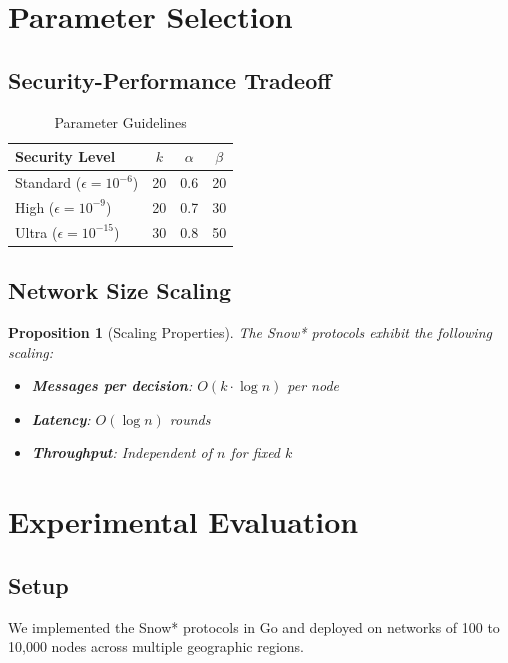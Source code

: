 \documentclass[11pt,a4paper]{article}
\newtheorem{proposition}[theorem]{Proposition}
\begin{document}
\section{Parameter Selection}

\subsection{Security-Performance Tradeoff}

\begin{table}[h]
\centering
\caption{Parameter Guidelines}
\begin{tabular}{@{}lccc@{}}
\toprule
Security Level & $k$ & $\alpha$ & $\beta$ \\
\midrule
Standard ($\epsilon = 10^{-6}$) & 20 & 0.6 & 20 \\
High ($\epsilon = 10^{-9}$) & 20 & 0.7 & 30 \\
Ultra ($\epsilon = 10^{-15}$) & 30 & 0.8 & 50 \\
\bottomrule
\end{tabular}
\end{table}

\subsection{Network Size Scaling}

\begin{proposition}[Scaling Properties]
The Snow* protocols exhibit the following scaling:
\begin{itemize}
    \item \textbf{Messages per decision}: $O(k \cdot \log n)$ per node
    \item \textbf{Latency}: $O(\log n)$ rounds
    \item \textbf{Throughput}: Independent of $n$ for fixed $k$
\end{itemize}
\end{proposition}

\section{Experimental Evaluation}

\subsection{Setup}

We implemented the Snow* protocols in Go and deployed on networks of 100 to 10,000 nodes across multiple geographic regions.
\end{document}
